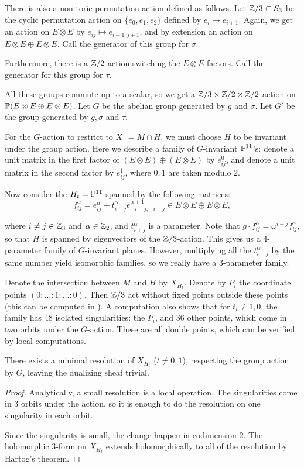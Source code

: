 There is also a non-toric permutation action defined as follows. Let $\Z/3 \subset S_3$ be the cyclic permutation action on $\{ e_0,e_1,e_2 \}$ defined by $e_i \mapsto e_{i+1}$. Again, we get an action on $E \otimes E$ by $e_{ij} \mapsto e_{i+1,j+1}$, and by extension an action on $E \otimes E \oplus E \otimes E$. Call the generator of this group for $\sigma$. 

Furthermore, there is a $\Z/2$-action switching the $E \otimes E$-factors. Call the generator for this group for $\tau$.

All these groups commute up to a scalar, so we get a $\Z/3 \times \Z/2 \times \Z/2$-action on $\P(E \otimes E \oplus E \otimes E)$. Let $G$ be the abelian group generated by $g$ and $\sigma$. Let $G'$ be the group generated by $g, \sigma$ and $\tau$. 

For the $G$-action to restrict to $X_1=M \cap H$, we must choose $H$ to be invariant under the group action. Here we describe a family of $G$-invariant $\P^{11}$'s: denote a unit matrix in the first factor of $(E \otimes E) \oplus (E \otimes E)$ by $e_{ij}^0$, and denote a unit matrix in the second factor by $e_{ij}^1$, where $0,1$ are taken modulo $2$. 

Now consider the $H_t=\P^{11}$ spanned by the following matrices:
\begin{equation}
\label{eq:fija}
f_{ij}^\alpha = e_{ij}^\alpha + t_{i-j}^\alpha e_{-i-j,-i-j}^{\alpha+1} \in E \otimes E \oplus E \otimes E,
\end{equation}

where $i \neq j \in \Z_3$ and $\alpha \in \Z_2$, and $t_{i+j}^\alpha$ is a parameter. Note that $g \cdot f_{ij}^\alpha = \omega^{i+j} f_{ij}^\alpha$, so that $H$ is spanned by eigenvectors of the $\Z/3$-action. This gives us a $4$-parameter family of $G$-invariant planes. However, multiplying all the $t_{i-j}^\alpha$ by the same number yield isomorphic families, so we really have a $3$-parameter family.

Denote the intersection between $M$ and $H$ by $X_{H_t}$. Denote by $P_i$ the coordinate points $(0:\ldots:1:\ldots:0)$. Then $\Z/3$ act without fixed points outside these points (this can be computed in \MM). A \MM computation also shows that for $t_i \neq 1,0$, the family has $48$ isolated singularities: the $P_i$, and $36$ other points, which come in two orbits under the $G$-action. These are all double points, which can be verified by local computations.

\begin{lemma}
There exists a minimal resolution of $X_{H_t}$ ($t \neq 0,1$), respecting the group action by $G$, leaving the dualizing sheaf trivial.
\end{lemma}
\begin{proof}
Analytically, a small resolution is a local operation. The singularities come in $3$ orbits under the action, so it is enough to do the resolution on one singularity in each orbit.

Since the singularity is small, the change happen in codimension $2$. The holomorphic $3$-form on $X_{H_t}$ extends holomorphically to all of the resolution by Hartog's theorem.
\end{proof}

